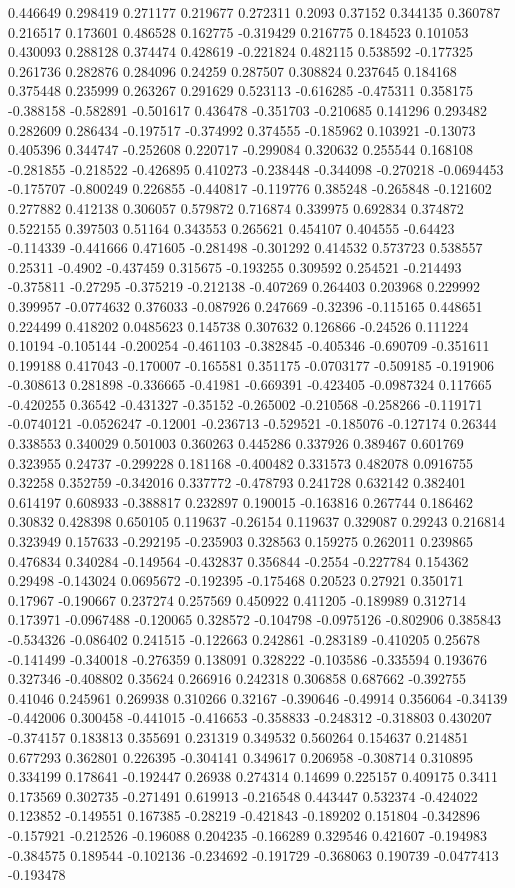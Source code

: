 0.446649 0.298419 0.271177 0.219677 0.272311 0.2093 0.37152 0.344135 0.360787 0.216517 0.173601 0.486528 0.162775 -0.319429 0.216775 0.184523 0.101053 0.430093 0.288128 0.374474 0.428619 -0.221824 0.482115 0.538592 -0.177325 0.261736 0.282876 0.284096 0.24259 0.287507 0.308824 0.237645 0.184168 0.375448 0.235999 0.263267 0.291629 0.523113 -0.616285 -0.475311 0.358175 -0.388158 -0.582891 -0.501617 0.436478 -0.351703 -0.210685 0.141296 0.293482 0.282609 0.286434 -0.197517 -0.374992 0.374555 -0.185962 0.103921 -0.13073 0.405396 0.344747 -0.252608 0.220717 -0.299084 0.320632 0.255544 0.168108 -0.281855 -0.218522 -0.426895 0.410273 -0.238448 -0.344098 -0.270218 -0.0694453 -0.175707 -0.800249 0.226855 -0.440817 -0.119776 0.385248 -0.265848 -0.121602 0.277882 0.412138 0.306057 0.579872 0.716874 0.339975 0.692834 0.374872 0.522155 0.397503 0.51164 0.343553 0.265621 0.454107 0.404555 -0.64423 -0.114339 -0.441666 0.471605 -0.281498 -0.301292 0.414532 0.573723 0.538557 0.25311 -0.4902 -0.437459 0.315675 -0.193255 0.309592 0.254521 -0.214493 -0.375811 -0.27295 -0.375219 -0.212138 -0.407269 0.264403 0.203968 0.229992 0.399957 -0.0774632 0.376033 -0.087926 0.247669 -0.32396 -0.115165 0.448651 0.224499 0.418202 0.0485623 0.145738 0.307632 0.126866 -0.24526 0.111224 0.10194 -0.105144 -0.200254 -0.461103 -0.382845 -0.405346 -0.690709 -0.351611 0.199188 0.417043 -0.170007 -0.165581 0.351175 -0.0703177 -0.509185 -0.191906 -0.308613 0.281898 -0.336665 -0.41981 -0.669391 -0.423405 -0.0987324 0.117665 -0.420255 0.36542 -0.431327 -0.35152 -0.265002 -0.210568 -0.258266 -0.119171 -0.0740121 -0.0526247 -0.12001 -0.236713 -0.529521 -0.185076 -0.127174 0.26344 0.338553 0.340029 0.501003 0.360263 0.445286 0.337926 0.389467 0.601769 0.323955 0.24737 -0.299228 0.181168 -0.400482 0.331573 0.482078 0.0916755 0.32258 0.352759 -0.342016 0.337772 -0.478793 0.241728 0.632142 0.382401 0.614197 0.608933 -0.388817 0.232897 0.190015 -0.163816 0.267744 0.186462 0.30832 0.428398 0.650105 0.119637 -0.26154 0.119637 0.329087 0.29243 0.216814 0.323949 0.157633 -0.292195 -0.235903 0.328563 0.159275 0.262011 0.239865 0.476834 0.340284 -0.149564 -0.432837 0.356844 -0.2554 -0.227784 0.154362 0.29498 -0.143024 0.0695672 -0.192395 -0.175468 0.20523 0.27921 0.350171 0.17967 -0.190667 0.237274 0.257569 0.450922 0.411205 -0.189989 0.312714 0.173971 -0.0967488 -0.120065 0.328572 -0.104798 -0.0975126 -0.802906 0.385843 -0.534326 -0.086402 0.241515 -0.122663 0.242861 -0.283189 -0.410205 0.25678 -0.141499 -0.340018 -0.276359 0.138091 0.328222 -0.103586 -0.335594 0.193676 0.327346 -0.408802 0.35624 0.266916 0.242318 0.306858 0.687662 -0.392755 0.41046 0.245961 0.269938 0.310266 0.32167 -0.390646 -0.49914 0.356064 -0.34139 -0.442006 0.300458 -0.441015 -0.416653 -0.358833 -0.248312 -0.318803 0.430207 -0.374157 0.183813 0.355691 0.231319 0.349532 0.560264 0.154637 0.214851 0.677293 0.362801 0.226395 -0.304141 0.349617 0.206958 -0.308714 0.310895 0.334199 0.178641 -0.192447 0.26938 0.274314 0.14699 0.225157 0.409175 0.3411 0.173569 0.302735 -0.271491 0.619913 -0.216548 0.443447 0.532374 -0.424022 0.123852 -0.149551 0.167385 -0.28219 -0.421843 -0.189202 0.151804 -0.342896 -0.157921 -0.212526 -0.196088 0.204235 -0.166289 0.329546 0.421607 -0.194983 -0.384575 0.189544 -0.102136 -0.234692 -0.191729 -0.368063 0.190739 -0.0477413 -0.193478 
